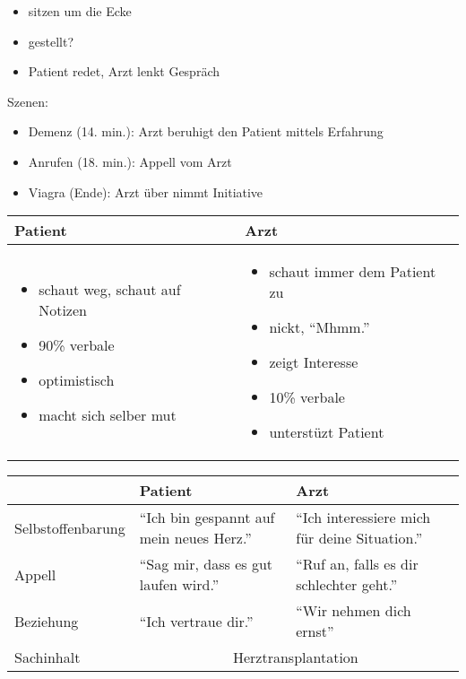 \documentclass[notitlepage,notoc,noindex,notodo]{wmnotes}
\begin{document}
\begin{itemize}
	\item sitzen um die Ecke
	\item gestellt?
	\item Patient redet, Arzt lenkt Gespräch
\end{itemize}

Szenen:
\begin{itemize}
	\item Demenz (14. min.): Arzt beruhigt den Patient mittels Erfahrung
	\item Anrufen (18. min.): Appell vom Arzt
	\item Viagra (Ende): Arzt über nimmt Initiative
\end{itemize}

\begin{tabular}{ p{} | p{} }
	Patient &Arzt \\\hline
	\begin{itemize}
		\item schaut weg, schaut auf Notizen
		\item 90\% verbale
		\item optimistisch
		\item macht sich selber mut
	\end{itemize}
	&\begin{itemize}
		\item schaut immer dem Patient zu
		\item nickt, \enquote{Mhmm.}
		\item zeigt Interesse
		\item 10\% verbale
		\item unterstüzt Patient
	\end{itemize}
\end{tabular}
\begin{tabular}{ p{} | p{} | p{} }
	&Patient &Arzt \\\hline
	Selbstoffenbarung &\enquote{Ich bin gespannt auf mein neues Herz.} &\enquote{Ich interessiere mich für deine Situation.} \\\hline
	Appell &\enquote{Sag mir, dass es gut laufen wird.} &\enquote{Ruf an, falls es dir schlechter geht.} \\\hline
	Beziehung &\enquote{Ich vertraue dir.} &\enquote{Wir nehmen dich ernst} \\\hline
	Sachinhalt &\multicolumn{2}{c}{Herztransplantation}
\end{tabular}
\end{document}
